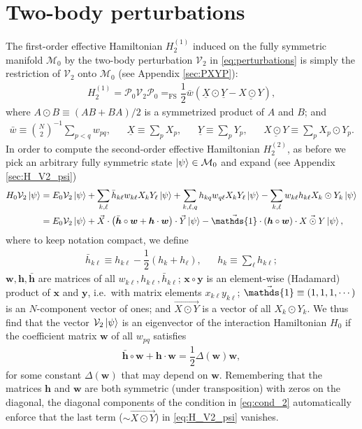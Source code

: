 \documentclass[nofootinbib,notitlepage,11pt]{revtex4-2}
\newcommand{\f}[2]{\dfrac{#1}{#2}} %
\newcommand{\p}[1]{\left(#1\right)} %
\renewcommand{\c}{\cdot} %
\renewcommand{\oc}{\circ} %
\newcommand{\m}{\bm} %
\renewcommand{\v}{\vec} %
\newcommand{\1}{\mathds{1}}
\newcommand{\M}{\mathcal{M}}
\renewcommand{\P}{\mathcal{P}}
\newcommand{\V}{\mathcal{V}}
\newcommand{\EQFS}{=_{\text{FS}}}
\newcommand{\col}{\underline}
\begin{document}
\section{Two-body perturbations}

The first-order effective Hamiltonian $H_2^{(1)}$ induced on the fully
symmetric manifold $\M_0$ by the two-body perturbation $\V_2$ in
\eqref{eq:perturbations} is simply the restriction of $\V_2$ onto
$\M_0$ (see Appendix \ref{sec:PXYP}):
\begin{align}
  H_2^{(1)}
  = \P_0 \V_2 \P_0
  \EQFS \f12 \bar w \p{\col{X}\odot\col{Y} - \col{X\odot Y}},
\end{align}
where $A\odot B\equiv\p{AB+BA}/2$ is a symmetrized product of $A$ and
$B$; and
\begin{align}
  \bar w \equiv {N\choose 2}^{-1} \sum_{p<q} w_{pq},
  &&
  \col{X} \equiv \sum_p X_p,
  &&
  \col{Y} \equiv \sum_p Y_p,
  &&
  \col{X\odot Y} \equiv \sum_p X_p\odot Y_p.
\end{align}
In order to compute the second-order effective Hamiltonian
$H_2^{(2)}$, as before we pick an arbitrary fully symmetric state
$\ket\psi\in\M_0$ and expand (see Appendix \ref{sec:H_V2_psi})
\begin{align}
  H_0 \V_2 \ket\psi
  &= E_0 \V_2 \ket\psi
  + \sum_{k,\ell} \bar h_{k\ell} w_{k\ell} X_k Y_\ell \ket\psi
  + \sum_{k,\ell,q} h_{kq} w_{q\ell} X_k Y_\ell \ket\psi
  - \sum_{k,\ell} w_{k\ell} h_{k\ell} X_k \odot Y_k \ket\psi \\
  &= E_0 \V_2 \ket\psi
  + \v X \c \p{\bar{\m h}\oc\m w + \m h\c\m w} \c \v Y \ket\psi
  - \v\1 \c \p{\m h\oc\m w} \c \v{X\odot Y} \ket\psi,
  \label{eq:H_V2_psi}
\end{align}
where to keep notation compact, we define
\begin{align}
  \bar h_{k\ell} \equiv h_{k\ell} - \f12\p{h_k + h_\ell},
  &&
  h_k \equiv \sum_\ell h_{k\ell};
\end{align}
$\m w,\m h,\bar{\m h}$ are matrices of all
$w_{k\ell},h_{k\ell},\bar h_{k\ell}$; $\m x\oc\m y$ is an element-wise
(Hadamard) product of $\m x$ and $\m y$, i.e.~with matrix elements
$x_{k\ell} y_{k\ell}$; $\v\1\equiv\p{1,1,1,\cdots}$ is an
$N$-component vector of ones; and $\v{X\odot Y}$ is a vector of all
$X_k\odot Y_k$.  We thus find that the vector $\V_2\ket\psi$ is an
eigenvector of the interaction Hamiltonian $H_0$ if the coefficient
matrix $\m w$ of all $w_{pq}$ satisfies
\begin{align}
  \bar{\m h}\oc\m w + \m h\c\m w = \f12 \Delta\p{\m w} \m w,
  \label{eq:cond_2}
\end{align}
for some constant $\Delta\p{\m w}$ that may depend on $\m w$.
Remembering that the matrices $\m h$ and $\m w$ are both symmetric
(under transposition) with zeros on the diagonal, the diagonal
components of the condition in \eqref{eq:cond_2} automatically enforce
that the last term ($\sim\v{X\odot Y}$) in \eqref{eq:H_V2_psi}
vanishes.
\end{document}
